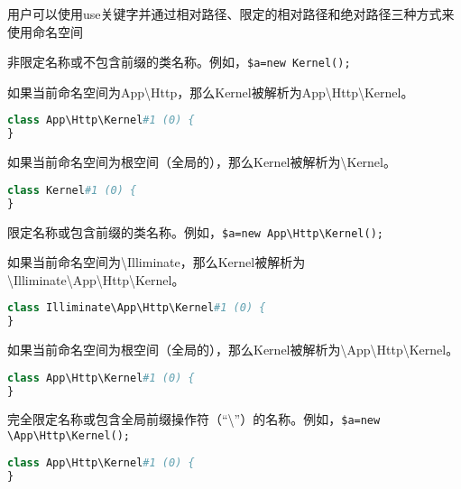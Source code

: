 用户可以使用use关键字并通过相对路径、限定的相对路径和绝对路径三种方式来使用命名空间

\begin{compactitem}
\item 非限定名称或不包含前缀的类名称。例如，\texttt{\$a=new Kernel();}

\begin{compactenum}
\item 如果当前命名空间为App\textbackslash Http，那么Kernel被解析为App\textbackslash Http\textbackslash Kernel。

\begin{lstlisting}[language=PHP]
class App\Http\Kernel#1 (0) {
}
\end{lstlisting}

\item 如果当前命名空间为根空间（全局的），那么Kernel被解析为\textbackslash Kernel。

\begin{lstlisting}[language=PHP]
class Kernel#1 (0) {
}
\end{lstlisting}

\end{compactenum}

\item 限定名称或包含前缀的类名称。例如，\texttt{\$a=new App\textbackslash Http\textbackslash Kernel();}

\begin{compactenum}
\item 如果当前命名空间为\textbackslash Illiminate，那么Kernel被解析为\textbackslash Illiminate\textbackslash App\textbackslash Http\textbackslash Kernel。

\begin{lstlisting}[language=PHP]
class Illiminate\App\Http\Kernel#1 (0) {
}
\end{lstlisting}

\item 如果当前命名空间为根空间（全局的），那么Kernel被解析为\textbackslash App\textbackslash Http\textbackslash Kernel。

\begin{lstlisting}[language=PHP]
class App\Http\Kernel#1 (0) {
}
\end{lstlisting}

\end{compactenum}

\item 完全限定名称或包含全局前缀操作符（“\textbackslash ”）的名称。例如，\texttt{\$a=new \textbackslash App\textbackslash Http\textbackslash Kernel();}


\begin{lstlisting}[language=PHP]
class App\Http\Kernel#1 (0) {
}
\end{lstlisting}

\end{compactitem}


